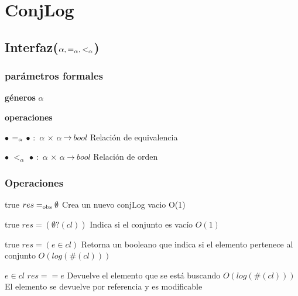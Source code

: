 \section{ConjLog}

\subsection{Interfaz($\alpha, \igsub{\alpha}, <_\alpha$)}

	\subsubsection{parámetros formales}
	\begin{description}[labelindent=1cm]
	\item[] \textbf{g\'eneros} $\alpha$
	\item[] \textbf{operaciones} 
			\begin{description}[labelindent=1cm] 
			\item[] $\bullet$ $\igsub{\alpha}$ $\bullet$ $:$ $\alpha$ $\times$ $\alpha$ $\!\rightarrow\!$ $bool$ \indent Relación de equivalencia
			\item[] $\bullet$ $<_\alpha$ $\bullet$ $:$ $\alpha$ $\times$ $\alpha$ $\!\rightarrow\!$ $bool$	\indent Relación de orden
			\end{description}
	\end{description}
	


\subsubsection*{Operaciones}

{true}
{$res =_{\mathrm{obs}} \emptyset$}
{Crea un nuevo conjLog vacio}
{O(1)}
{}

{true}
{$res = (\emptyset?(cl))$}
{Indica si el conjunto es vacío}
{$O(1)$}
{}

{true}
{$res = (e \in cl)$}
{Retorna un booleano que indica si el elemento pertenece al conjunto}
{$O(log(\#(cl)))$}
{}

{$e \in cl$}
{$res == e$}
{Devuelve el elemento que se está buscando}
{$O(log(\#(cl)))$}
{El elemento se devuelve por referencia y es modificable}

